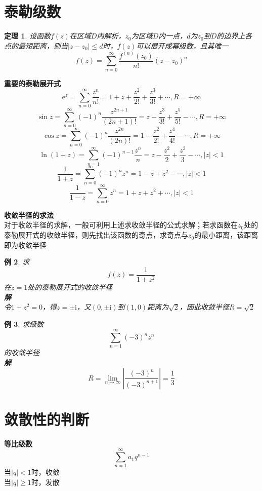 \documentclass[12pt, a4paper, twoside]{ctexbook}
\newtheorem{theorem}{定理}[section]
\newtheorem{example}[theorem]{例}
\begin{document}
\section{泰勒级数}
\begin{theorem}
	设函数$f\left(z\right)$在区域$D$内解析，$z_0$为区域$D$内一点，$d$为$z_0$到$D$的边界上各点的最短距离，则当$\left|z-z_0\right|\leqslant d$时，$f\left(z\right)$可以展开成幂级数，且其唯一
	$$
	f\left(z\right)=\sum_{n=0}^{\infty}{\frac{f^{(n)}\left(z_0\right)}{n!}\left(z-z_0\right)^n}
	$$
\end{theorem}
\textbf{重要的泰勒展开式}
$$
\mathrm{e}^z=\sum_{n=0}^{\infty}\frac{z^n}{n!}=1+z+\frac{z^2}{2!}+\frac{z^3}{3!}+\cdots,R=+\infty
$$
$$
\sin z = \sum_{n=0}^{\infty}(-1)^n\frac{z^{2n+1}}{(2n+1)!}=z-\frac{z^3}{3!}+\frac{z^5}{5!}-\cdots,R=+\infty
$$
$$
\cos z = \sum_{n=0}^{\infty}(-1)^n\frac{z^{2n}}{(2n)!}=1-\frac{z^2}{2!}+\frac{z^4}{4!}-\cdots,R=+\infty
$$
$$
\ln\left(1+z\right)=\sum_{n=1}^{\infty}(-1)^{n-1}\frac{z^n}{n}=z-\frac{z^2}{2}+\frac{z^3}{3}-\cdots,\left|z\right|<1
$$
$$
\frac{1}{1+z}=\sum_{n=0}^{\infty}(-1)^nz^n=1-z+z^2-\cdots,\left|z\right|<1
$$
$$
\frac{1}{1-z}=\sum_{n=0}^{\infty}z^n=1+z+z^2+\cdots,\left|z\right|<1
$$

\textbf{收敛半径的求法}\\
对于收敛半径的求解，一般可利用上述求收敛半径的公式求解；若求函数在$z_0$处的泰勒展开式的收敛半径，则先找出该函数的奇点，求奇点与$z_0$的最小距离，该距离即为收敛半径
\begin{example}
	求
	$$
	f\left(z\right)=\frac{1}{1+z^2}
	$$
	\hspace*{2em}在$z=1$处的泰勒展开式的收敛半径\\
	\hspace*{1em}\textbf{解}\\
	\hspace*{2em}令$1+z^2=0$，得$z=\pm \mathrm{i}$，又$\left(0,\pm \mathrm{i}\right)$到$\left(1,0\right)$距离为$\sqrt{2}$，因此收敛半径$R=\sqrt{2}$
\end{example}
\begin{example}
	求级数
	$$
	\sum_{n=1}^{\infty}\left(-3\right)^nz^n
	$$
	\hspace*{2em}的收敛半径\\
	\hspace*{1em}\textbf{解}
	$$
	R=\lim_{n\to \infty}\left|\frac{\left(-3\right)^n}{\left(-3\right)^{n+1}}\right|=\frac{1}{3}
	$$
\end{example}
\section{敛散性的判断}
\textbf{等比级数}
$$
\sum_{n=1}^{\infty}a_1q^{n-1}
$$
\hspace*{3em}当$\left|q\right|<1$时，收敛\\
\hspace*{3em}当$\left|q\right|\geqslant1$时，发散\\
\end{document}
